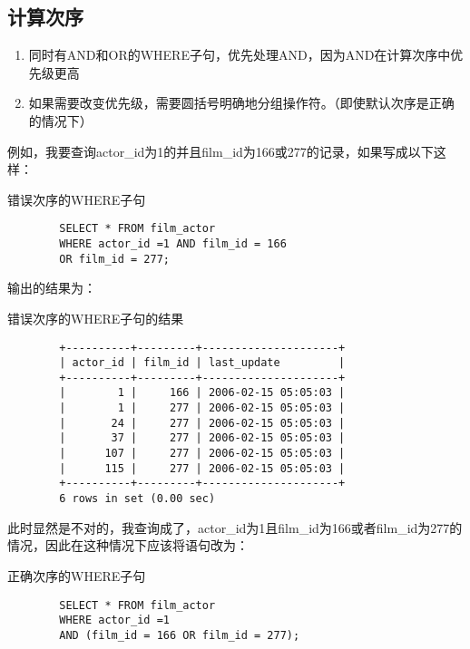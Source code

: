 \documentclass[UTF8]{article}
\begin{document}
\subsection{计算次序}
\begin{orangebox}[frametitle={Tips 7.4}]
        \begin{enumerate}
            \item 同时有AND和OR的WHERE子句，优先处理AND，因为AND在计算次序中优先级更高
            \item 如果需要改变优先级，需要圆括号明确地分组操作符。（即使默认次序是正确的情况下）
        \end{enumerate}
\end{orangebox}
例如，我要查询actor\_id为1的并且film\_id为166或277的记录，如果写成以下这样：
\begin{listing}[H]
	\caption{错误次序的WHERE子句}
	\label{code:faultwhereclause}
\begin{verbatim}
        SELECT * FROM film_actor 
        WHERE actor_id =1 AND film_id = 166 
        OR film_id = 277;
\end{verbatim}
\end{listing}

输出的结果为：

\begin{listing}[H]
	\caption{错误次序的WHERE子句的结果}
	\label{code:faultwhereclauseresult}
\begin{verbatim}
        +----------+---------+---------------------+
        | actor_id | film_id | last_update         |
        +----------+---------+---------------------+
        |        1 |     166 | 2006-02-15 05:05:03 |
        |        1 |     277 | 2006-02-15 05:05:03 |
        |       24 |     277 | 2006-02-15 05:05:03 |
        |       37 |     277 | 2006-02-15 05:05:03 |
        |      107 |     277 | 2006-02-15 05:05:03 |
        |      115 |     277 | 2006-02-15 05:05:03 |
        +----------+---------+---------------------+
        6 rows in set (0.00 sec)
\end{verbatim}
\end{listing}
此时显然是不对的，我查询成了，actor\_id为1且film\_id为166或者film\_id为277的情况，因此在这种情况下应该将语句改为：
\begin{listing}[H]
	\caption{正确次序的WHERE子句}
	\label{code:rightwhereclause}
\begin{verbatim}
        SELECT * FROM film_actor 
        WHERE actor_id =1 
        AND (film_id = 166 OR film_id = 277);
\end{verbatim}
\end{listing}
\end{document}
